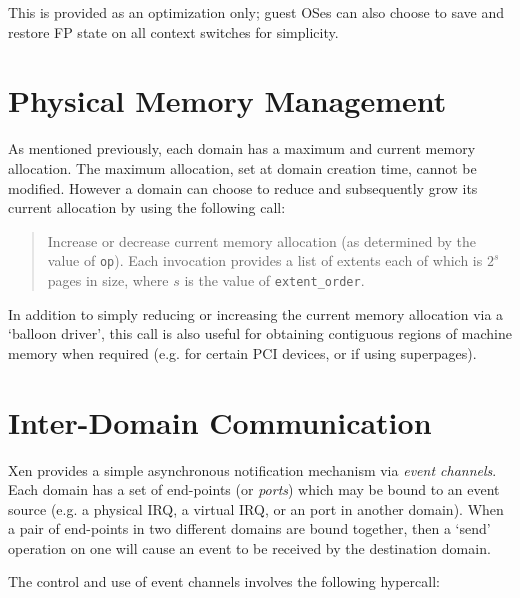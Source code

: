 \documentclass[11pt,twoside,final,openright]{report}
\begin{document}
This is provided as an optimization only; guest OSes can also choose
to save and restore FP state on all context switches for simplicity. 


\section{Physical Memory Management}

As mentioned previously, each domain has a maximum and current 
memory allocation. The maximum allocation, set at domain creation 
time, cannot be modified. However a domain can choose to reduce 
and subsequently grow its current allocation by using the
following call: 

\begin{quote} 

Increase or decrease current memory allocation (as determined by 
the value of {\tt op}). Each invocation provides a list of 
extents each of which is $2^s$ pages in size, 
where $s$ is the value of {\tt extent\_order}. 

\end{quote} 

In addition to simply reducing or increasing the current memory
allocation via a `balloon driver', this call is also useful for 
obtaining contiguous regions of machine memory when required (e.g. 
for certain PCI devices, or if using superpages).  


\section{Inter-Domain Communication}
\label{s:idc} 

Xen provides a simple asynchronous notification mechanism via
\emph{event channels}. Each domain has a set of end-points (or
\emph{ports}) which may be bound to an event source (e.g. a physical
IRQ, a virtual IRQ, or an port in another domain). When a pair of
end-points in two different domains are bound together, then a `send'
operation on one will cause an event to be received by the destination
domain.

The control and use of event channels involves the following hypercall: 
\end{document}
